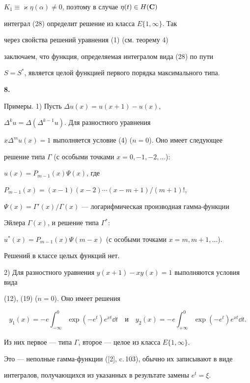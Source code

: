 {$K_1\equiv\varkappa \eta(\alpha)\ne 0$, поэтому в случае $\eta(t)\in H(\bold C)$


интеграл (28) определит решение из класса $E\{ 1,\infty \}$. Так


через свойства решений уравнения (1) (см. теорему 4)


заключаем, что функция, определяемая интегралом вида (28) по пути


$S=S^*$, является целой функцией первого порядка максимального типа.


\medskip





{\bf 8.}


Примеры. 1) Пусть $\Delta u(x)=u(x+1)-u(x)$,


$\Delta^ku=\Delta(\Delta^{k-1}u)$. Для разностного уравнения


$x\Delta^mu(x)=1$ выполняется условие (4) ($n=0$). Оно имеет следующее


решение типа $\Gamma$ (с особыми точками $x=0,-1,-2,\dotsc$):


$u(x)=P_{m-1}(x)\Psi(x)$, где


$P_{m-1}(x)=(x-1)(x-2)\dotsb(x-m+1)/(m+1)!$,


$\Psi(x)=\Gamma'(x)/\Gamma(x)$ --- логарифмическая производная гамма-функции


Эйлера $\Gamma(x)$, и решение типа $\Gamma^*$:


$u^*(x)=P_{m-1}(x)\Psi(m-x)$ (с особыми точками $x=m,m+1,\dotsc$).


Решений в классе целых функций нет.





2) Для разностного уравнения $y(x+1)-xy(x)=1$ выполняются условия вида


(12), (19) ($n=0$). Оно имеет решения


$$


y_1(x)=-e\int_{-\infty}^0\exp(-e^t)e^{xt}\dd t \quad \text{и} \quad


y_2(x)=-e\int_{+\infty}^0\exp(-e^t)e^{xt}\dd t.


$$


Из них первое --- типа $\Gamma$, второе --- целое из класса $E\{ 1,\infty \}$.


Это --- неполные гамма-функции ([2], c.\,103), обычно их записывают в виде


интегралов, получающихся из указанных в результате замены $e^t=\xi$.





}
